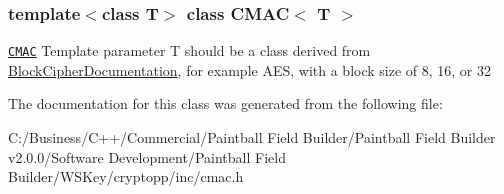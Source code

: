 \subsubsection*{template$<$class T$>$ class CMAC$<$ T $>$}

\href{http://www.cryptolounge.org/wiki/CMAC}{\tt CMAC} Template parameter T should be a class derived from \hyperlink{struct_block_cipher_documentation}{BlockCipherDocumentation}, for example AES, with a block size of 8, 16, or 32 

The documentation for this class was generated from the following file:\begin{DoxyCompactItemize}
\item 
C:/Business/C++/Commercial/Paintball Field Builder/Paintball Field Builder v2.0.0/Software Development/Paintball Field Builder/WSKey/cryptopp/inc/cmac.h\end{DoxyCompactItemize}
